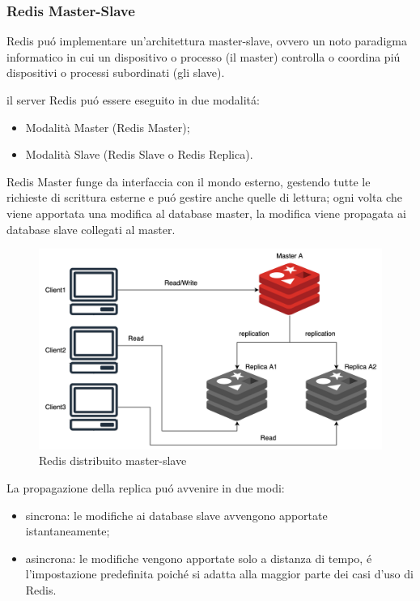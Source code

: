 \subsubsection{Redis Master-Slave}
Redis puó implementare un'architettura master-slave, ovvero un noto paradigma informatico in cui un dispositivo o processo (il master)
controlla o coordina piú dispositivi o processi subordinati (gli slave).

il server Redis puó essere eseguito in due modalitá:
\begin{itemize}
    \item Modalità Master (Redis Master);
    \item Modalità Slave (Redis Slave o Redis Replica).
\end{itemize}


Redis Master funge da interfaccia con il mondo esterno, gestendo tutte le richieste di scrittura esterne e puó gestire anche
quelle di lettura;
ogni volta che viene apportata una modifica al database master, la modifica viene propagata ai database slave collegati al master.\\

\begin{figure}[H]
\includegraphics[width=1\textwidth]{img/masterslaveRedis}
\caption{Redis distribuito master-slave}
\end{figure}

La propagazione della replica puó avvenire in due modi:
\begin{itemize}
    \item sincrona: le modifiche ai database slave avvengono apportate istantaneamente;
    \item asincrona: le modifiche vengono apportate solo a distanza di tempo, é l'impostazione predefinita poiché si adatta
    alla maggior parte dei casi d'uso di Redis.
\end{itemize}

